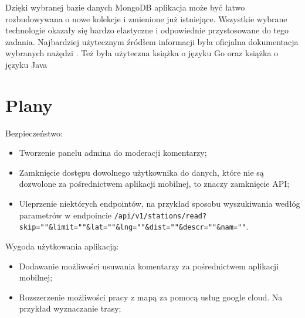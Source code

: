 Dzięki wybranej bazie danych MongoDB aplikacja może być łatwo rozbudowywana o nowe kolekcje i zmienione już istniejące. Wszystkie wybrane technologie okazały się bardzo elastyczne i odpowiednie przystosowane do tego zadania.
Najbardziej użytecznym źródłem informacji była oficjalna dokumentacja wybranych nażędzi \cite{android_doc,godoc,golang2,mongoDB_doc}. Też była użyteczna książka o języku Go \cite{LearninGo} oraz książka o języku Java \cite{javabook}
%
\section{Plany}
\label{sec:plany}

Bezpieczeństwo:
\begin{itemize}
    \item Tworzenie panelu admina do moderacji komentarzy;
    \item Zamknięcie dostępu dowolnego użytkownika do danych, które nie są dozwolone za pośrednictwem aplikacji mobilnej, to znaczy zamknięcie API;
    \item Uleprzenie niektórych endpointów, na przykład sposobu wyszukiwania wedłóg parametrów w endpoincie \texttt{/api/v1/stations/read?skip=""\&limit=""\&lat=""\&lng=""\&dist=""\&descr=""\&nam=""}.
\end{itemize}

Wygoda użytkowania aplikacją:
\begin{itemize}
    \item Dodawanie możliwości usuwania komentarzy za pośrednictwem aplikacji mobilnej;
    \item Rozszerzenie możliwości pracy z mapą za pomocą usług google cloud. Na przykład wyznaczanie trasy;
\end{itemize}